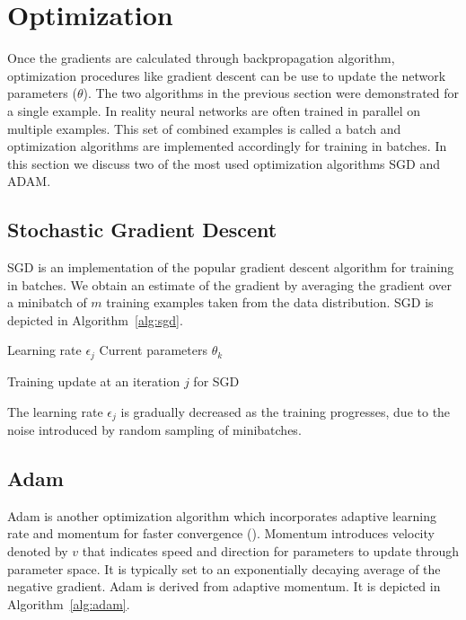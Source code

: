   
\section{Optimization}
Once the gradients are calculated through backpropagation algorithm, optimization procedures like gradient descent can be use to update the network parameters ($\theta$). The two algorithms in the previous section were demonstrated for a single example. In reality neural networks are often trained in parallel on multiple examples. This set of combined examples is called a batch and optimization algorithms are implemented accordingly for training in batches. In this section we discuss two of the most used optimization algorithms \ac{SGD} and ADAM. 

\subsection{Stochastic Gradient Descent}
\ac{SGD} is an implementation of the popular gradient descent algorithm for training in batches. We obtain an estimate of the gradient by averaging the gradient over a minibatch of $m$ training examples taken from the data distribution. \ac{SGD} is depicted in Algorithm~\ref{alg:sgd}.  

\begin{algorithm}
	\SetAlgoLined
	Learning rate $\epsilon_{j}$\;
	Current parameters $\theta_{k}$\;
	\caption{Training update at an iteration $j$ for \acf{SGD}}
	\label{alg:sgd}
\end{algorithm}

The learning rate $\epsilon_{j}$ is gradually decreased as the training progresses, due to the noise introduced by random sampling of minibatches. 

\subsection{Adam}
Adam is another optimization algorithm which incorporates adaptive learning rate and momentum for faster convergence (\cite{kingma2014adam}). Momentum introduces velocity denoted by $v$ that indicates speed and direction for parameters to update through parameter space. It is typically set to an exponentially decaying average of the negative gradient. Adam is derived from adaptive momentum. It is depicted in Algorithm~\ref{alg:adam}.

